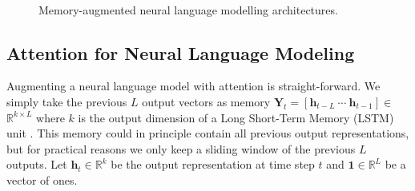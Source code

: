 \documentclass{article}
\newcommand{\vect}[1]{\ensuremath{\bm{#1}}}
\newcommand{\mat}[1]{\ensuremath{\bm{#1}}}
\begin{document}
\begin{figure}[t!]
\hfill
{}\\
\hfill
{}
\caption{Memory-augmented neural language modelling architectures.}
\label{fig:methods}
\end{figure}



\subsection{Attention for Neural Language Modeling}
\label{sec:att}
Augmenting a neural language model with attention \citep{bahdanau2014neural} is straight-forward.
We simply take the previous $L$ output vectors as memory 
$\mat{Y}_t = [\vect{h}_{t-L}\ \cdots\ \vect{h}_{t-1}] \in$ $\mathbb{R}^{k\times L}$ 
where $k$ is the output dimension of a Long Short-Term Memory (LSTM) unit \citep{HOC97}.
This memory could in principle contain all previous output representations, but for practical reasons we only keep a sliding window of the previous $L$ outputs.
Let $\vect{h}_t \in \mathbb{R}^k$ be the output representation at time step $t$ and $\vect{1}\in\mathbb{R}^L$ be a vector of ones.
\end{document}

